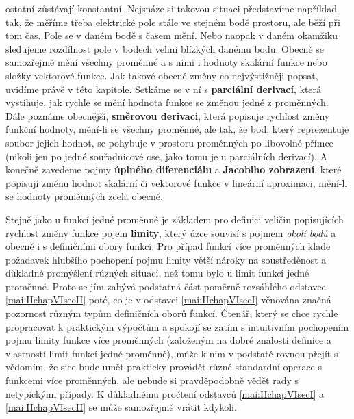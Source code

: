   ostatní zůstávají konstantní. Nejsnáze si takovou situaci představíme například tak, že měříme
  třeba elektrické pole stále ve stejném bodě prostoru, ale běží při tom čas. Pole se v daném bodě s
  časem mění. Nebo naopak v daném okamžiku sledujeme rozdílnost pole v bodech velmi blízkých danému
  bodu. Obecně se samozřejmě mění všechny proměnné a s nimi i hodnoty skalární funkce nebo složky
  vektorové funkce. Jak takové obecné změny co nejvýstižněji popsat, uvidíme právě v této kapitole.
  Setkáme se v ní s \textbf{parciální derivací}, která vystihuje, jak rychle se mění hodnota funkce
  se změnou jedné z proměnných. Dále poznáme obecnější, \textbf{směrovou derivaci}, která popisuje
  rychlost změny funkční hodnoty, mění-li se všechny proměnné, ale tak, že bod, který reprezentuje
  soubor jejich hodnot, se pohybuje v prostoru proměnných po libovolné přímce (nikoli jen po jedné
  souřadnicové ose, jako tomu je u parciálních derivací). A konečně zavedeme pojmy \textbf{úplného
  diferenciálu} a \textbf{Jacobiho zobrazení}, které popisují změnu hodnot skalární či vektorové
  funkce v lineární aproximaci, mění-li se hodnoty proměnných zcela obecně.

  Stejně jako u funkcí jedné proměnné je základem pro definici veličin popisujících rychlost změny
  funkce pojem \textbf{limity}, který úzce souvisí s pojmem \emph{okolí bodů} a obecně i s
  definičními obory funkcí. Pro případ funkcí více proměnných klade požadavek hlubšího pochopení
  pojmu limity větší nároky na soustředěnost a důkladné promýšlení různých situací, než tomu bylo u
  limit funkcí jedné proměnné. Proto se jím zabývá podstatná část poměrně rozsáhlého odstavce
  \ref{mai:IIchapVIsecII} poté, co je v odstavci \ref{mai:IIchapVIsecI} věnována značná pozornost
  různým typům definičních oborů funkcí. Čtenář, který se chce rychle propracovat k praktickým
  výpočtům a spokojí se zatím s intuitivním pochopením pojmu limity funkce více proměnných
  (založeným na dobré znalosti definice a vlastností limit funkcí jedné proměnné), může k nim v
  podstatě rovnou přejít s vědomím, že sice bude umět prakticky provádět různé standardní operace s
  funkcemi více proměnných, ale nebude si pravděpodobně vědět rady s netypickými případy. K
  důkladnému pročtení odstavců \ref{mai:IIchapVIsecI} a \ref{mai:IIchapVIsecII} se může samozřejmě
  vrátit kdykoli.

